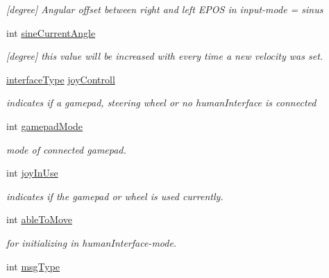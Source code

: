 \begin{DoxyCompactItemize}
\begin{DoxyCompactList}\small\item\em \mbox{[}degree\mbox{]} Angular offset between right and left E\-P\-O\-S in input-\/mode = sinus \end{DoxyCompactList}\item 
int \hyperlink{structSampleMoving_1_1sampleMovingSettingStruct_afa71f7ba92e0214107179417d59aa7d6}{sine\-Current\-Angle}
\begin{DoxyCompactList}\small\item\em \mbox{[}degree\mbox{]} this value will be increased with every time a new velocity was set. \end{DoxyCompactList}\item 
\hypertarget{structSampleMoving_1_1sampleMovingSettingStruct_abcbeb9363905012770950c4908a4e1aa}{\hyperlink{classSampleMoving_ad495d48e1ec2093a36601548bfad852d}{interface\-Type} \hyperlink{structSampleMoving_1_1sampleMovingSettingStruct_abcbeb9363905012770950c4908a4e1aa}{joy\-Controll}}\label{structSampleMoving_1_1sampleMovingSettingStruct_abcbeb9363905012770950c4908a4e1aa}

\begin{DoxyCompactList}\small\item\em indicates if a gamepad, steering wheel or no human\-Interface is connected \end{DoxyCompactList}\item 
int \hyperlink{structSampleMoving_1_1sampleMovingSettingStruct_a1b3cbdffd2c270871b009022b1f65eb0}{gamepad\-Mode}
\begin{DoxyCompactList}\small\item\em mode of connected gamepad. \end{DoxyCompactList}\item 
int \hyperlink{structSampleMoving_1_1sampleMovingSettingStruct_aa1245c04ef0560d0192ff60ef7daace8}{joy\-In\-Use}
\begin{DoxyCompactList}\small\item\em indicates if the gamepad or wheel is used currently. \end{DoxyCompactList}\item 
int \hyperlink{structSampleMoving_1_1sampleMovingSettingStruct_a14089eeff8e96683e056b50c6ae6a998}{able\-To\-Move}
\begin{DoxyCompactList}\small\item\em for initializing in human\-Interface-\/mode. \end{DoxyCompactList}\item 
\hypertarget{structSampleMoving_1_1sampleMovingSettingStruct_af9c784abc287cfcfc6df641c99b52c47}{int \hyperlink{structSampleMoving_1_1sampleMovingSettingStruct_af9c784abc287cfcfc6df641c99b52c47}{msg\-Type}}\label{structSampleMoving_1_1sampleMovingSettingStruct_af9c784abc287cfcfc6df641c99b52c47}


\end{DoxyCompactItemize}

